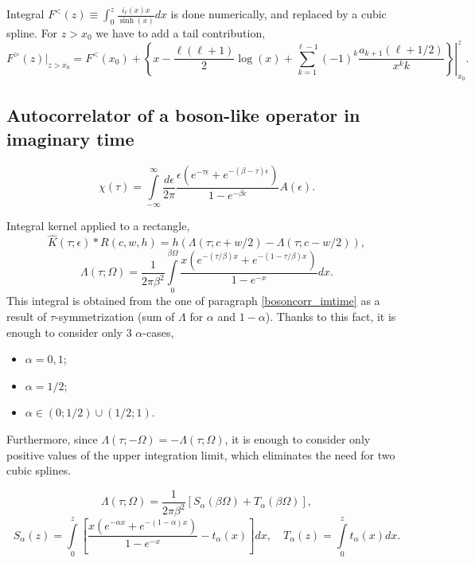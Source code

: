 \documentclass[]{article}
\begin{document}
Integral $F^<(z) \equiv \int_0^z \frac{i_\ell(x)x}{\sinh(x)} dx$ is done numerically,
and replaced by a cubic spline. For $z>x_0$ we have to add a tail contribution,
\begin{equation}
F^>(z)|_{z>x_0} = F^<(x_0) +
\left.\left\{
x - \frac{\ell(\ell+1)}{2}\log(x) +
\sum_{k=1}^{\ell-1} (-1)^k\frac{a_{k+1}(\ell+1/2)}{x^k k}
\right\}\right|_{x_0}^z.
\end{equation}

\subsection{Autocorrelator of a boson-like operator in imaginary time}
\label{bosonautocorr_imtime}
\begin{equation}
\chi(\tau) = \int\limits_{-\infty}^\infty \frac{d\epsilon}{2\pi}
\frac{\epsilon (e^{-\tau\epsilon}+e^{-(\beta-\tau)\epsilon})}
{1-e^{-\beta\epsilon}} A(\epsilon).
\end{equation}

Integral kernel applied to a rectangle,
\begin{equation}
\hat K(\tau;\epsilon)*R(c,w,h) =
h(\Lambda(\tau;c+w/2) - \Lambda(\tau;c-w/2)),
\end{equation}
\begin{equation}
\Lambda(\tau;\Omega) = \frac{1}{2\pi\beta^2}
\int\limits_0^{\beta\Omega}\frac{x(e^{-(\tau/\beta)x}+e^{-(1-\tau/\beta)x})}
{1-e^{-x}}dx.
\end{equation}
This integral is obtained from the one of paragraph \ref{bosoncorr_imtime}
as a result of $\tau$-symmetrization (sum of $\Lambda$ for $\alpha$ and $1-\alpha$).
Thanks to this fact, it is enough to consider only 3 $\alpha$-cases,
\begin{itemize}
	\item $\alpha=0,1$;
	\item $\alpha=1/2$;
	\item $\alpha\in(0;1/2)\cup(1/2;1)$.
\end{itemize}
Furthermore, since $\Lambda(\tau;-\Omega) = -\Lambda(\tau;\Omega)$, it is enough to consider only positive  values of the upper integration limit, which eliminates the need for two cubic splines.

\begin{equation}
\Lambda(\tau;\Omega) = \frac{1}{2\pi\beta^2} \left[
S_\alpha(\beta\Omega) + T_\alpha(\beta\Omega) \right],
\end{equation}
\begin{equation}
S_\alpha(z) = \int\limits_0^z
\left[\frac{x(e^{-\alpha x}+e^{-(1-\alpha)x})}{1-e^{-x}} - t_\alpha(x)
\right] dx, \quad
T_\alpha(z) = \int\limits_0^z t_\alpha(x) dx.
\end{equation}
\end{document}
